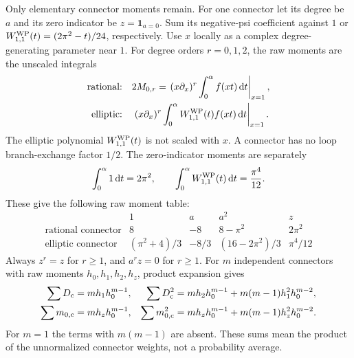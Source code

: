 \documentclass[a4paper,10pt]{article}
\numberwithin{equation}{section}
\newcommand{\dd}{\mathrm{d}}
\theoremstyle{paperplain}
\theoremstyle{paperremark}
\theoremstyle{paperplain}
\begin{document}
Only elementary connector moments remain. For one connector let its
degree be $a$ and its zero indicator be $z=\mathbf1_{a=0}$. Sum its
negative-psi coefficient against $1$ or
$W^{\rm WP}_{1,1}(t)=(2\pi^2-t)/24$, respectively. Use $x$ locally
as a complex degree-generating parameter near $1$. For degree orders
$r=0,1,2$, the raw moments are the unscaled integrals
\[
\begin{aligned}
 \text{rational:}\quad &2M_{0,r}
 =\left.(x\partial_x)^r\int_0^\alpha f(xt)\,\dd t\right|_{x=1},\\
 \text{elliptic:}\quad &\left.(x\partial_x)^r
   \int_0^\alpha W^{\rm WP}_{1,1}(t)f(xt)\,\dd t\right|_{x=1}.
\end{aligned}
\]
The elliptic polynomial $W^{\rm WP}_{1,1}(t)$ is not scaled with $x$. A connector
has no loop branch-exchange factor $1/2$. The zero-indicator moments
are separately
\[
 \int_0^\alpha 1\,\dd t=2\pi^2,\qquad
 \int_0^\alpha W^{\rm WP}_{1,1}(t)\,\dd t=\frac{\pi^4}{12}.
\]
These give the following raw moment table:
\begin{equation}\label{eq:a:connector-moments}
\begin{array}{c|rrrr}
 &1&a&a^2&z\\\hline
 \text{rational connector}&8&-8&8-\pi^2&2\pi^2\\
 \text{elliptic connector}&(\pi^2+4)/3&-8/3&(16-2\pi^2)/3&\pi^4/12
\end{array}
\end{equation}
Always $z^r=z$
for $r\geq1$, and $a^r z=0$ for $r\geq1$. For $m$ independent
connectors with raw moments $h_0,h_1,h_2,h_z$, product expansion gives
\begin{align*}
 \sum D_{\rm c}&=mh_1h_0^{m-1},&
 \sum D_{\rm c}^2&=mh_2h_0^{m-1}+m(m-1)h_1^2h_0^{m-2},\\
 \sum m_{0,\rm c}&=mh_zh_0^{m-1},&
 \sum m_{0,\rm c}^2&=mh_zh_0^{m-1}+m(m-1)h_z^2h_0^{m-2}.
\end{align*}
For $m=1$ the terms with $m(m-1)$ are absent. These sums mean the
product of the unnormalized connector weights, not a probability
average.
\end{document}
